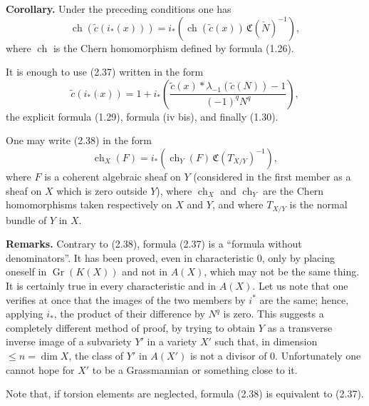 \documentclass[11pt]{article}
\newcommand{\Gr}{\operatorname{Gr}}
\newcommand{\ch}{\operatorname{ch}}
\providecommand{\ch}{\operatorname{ch}}
\providecommand{\Gr}{\operatorname{Gr}}
\providecommand{\Gr}{\operatorname{G}}
\begin{document}
\textbf{Corollary.} Under the preceding conditions one has
\begin{equation}\tag{2.38}
 \ch(\widetilde c(i_*(x)))=i_*\left(\ch(\widetilde c(x))\,\mathfrak C(\check N)^{-1}\right),
\end{equation}
where $\ch$ is the Chern homomorphism defined by formula (1.26).

It is enough to use (2.37) written in the form
\begin{equation}\tag{2.37 bis}
 \widetilde c(i_*(x))=1+i_*\left(\frac{\widetilde c(x)*\lambda_{-1}(\widetilde c(N))-1}{(-1)^qN^q}\right),
\end{equation}
the explicit formula (1.29), formula (iv bis), and finally (1.30).

One may write (2.38) in the form
\begin{equation}\tag{2.38 bis}
 \ch_X(F)=i_*\left(\ch_Y(F)\,\mathfrak C(T_{X/Y})^{-1}\right),
\end{equation}
where $F$ is a coherent algebraic sheaf on $Y$ (considered in the first member as a sheaf on $X$ which is zero outside $Y$), where $\ch_X$ and $\ch_Y$ are the Chern homomorphisms taken respectively on $X$ and $Y$, and where $T_{X/Y}$ is the normal bundle of $Y$ in $X$.

\textbf{Remarks.} Contrary to (2.38), formula (2.37) is a ``formula without denominators''. It has been proved, even in characteristic $0$, only by placing oneself in $\Gr(K(X))$ and not in $A(X)$, which may not be the same thing. It is certainly true in every characteristic and in $A(X)$. Let us note that one verifies at once that the images of the two members by $i^*$ are the same; hence, applying $i_*$, the product of their difference by $N^q$ is zero. This suggests a completely different method of proof, by trying to obtain $Y$ as a transverse inverse image of a subvariety $Y'$ in a variety $X'$ such that, in dimension $\leq n=\dim X$, the class of $Y'$ in $A(X')$ is not a divisor of $0$. Unfortunately one cannot hope for $X'$ to be a Grassmannian or something close to it.

Note that, if torsion elements are neglected, formula (2.38) is equivalent to (2.37).
\end{document}
